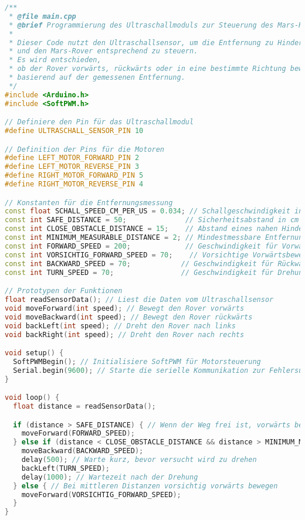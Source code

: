 \documentclass{vorlage-design-main}
\begin{document}
\begin{lstlisting}[language={C++}]
/**
 * @file main.cpp
 * @brief Programmierung des Ultraschallmoduls zur Steuerung des Mars-Rovers
 * 
 * Dieser Code nutzt den Ultraschallsensor, um die Entfernung zu Hindernissen zu messen 
 * und den Mars-Rover entsprechend zu steuern. 
 * Es wird entschieden, 
 * ob der Rover vorwärts, rückwärts oder in eine bestimmte Richtung bewegt werden soll, 
 * basierend auf der gemessenen Entfernung.
 */
#include <Arduino.h>
#include <SoftPWM.h>

// Definiere den Pin für das Ultraschallmodul
#define ULTRASCHALL_SENSOR_PIN 10

// Definition der Pins für die Motoren
#define LEFT_MOTOR_FORWARD_PIN 2
#define LEFT_MOTOR_REVERSE_PIN 3
#define RIGHT_MOTOR_FORWARD_PIN 5
#define RIGHT_MOTOR_REVERSE_PIN 4

// Konstanten für die Entfernungsmessung
const float SCHALL_SPEED_CM_PER_US = 0.034; // Schallgeschwindigkeit in cm/µs
const int SAFE_DISTANCE = 50;              // Sicherheitsabstand in cm
const int CLOSE_OBSTACLE_DISTANCE = 15;    // Abstand eines nahen Hindernisses in cm
const int MINIMUM_MEASURABLE_DISTANCE = 2; // Mindestmessbare Entfernung in cm
const int FORWARD_SPEED = 200;             // Geschwindigkeit für Vorwärtsbewegung
const int VORSICHTIG_FORWARD_SPEED = 70;    // Vorsichtige Vorwärtsbewegung
const int BACKWARD_SPEED = 70;            // Geschwindigkeit für Rückwärtsbewegung
const int TURN_SPEED = 70;                // Geschwindigkeit für Drehung

// Prototypen der Funktionen
float readSensorData(); // Liest die Daten vom Ultraschallsensor
void moveForward(int speed); // Bewegt den Rover vorwärts
void moveBackward(int speed); // Bewegt den Rover rückwärts
void backLeft(int speed); // Dreht den Rover nach links
void backRight(int speed); // Dreht den Rover nach rechts

void setup() {
  SoftPWMBegin(); // Initialisiere SoftPWM für Motorsteuerung
  Serial.begin(9600); // Starte die serielle Kommunikation zur Fehlersuche
}

void loop() {
  float distance = readSensorData();

  if (distance > SAFE_DISTANCE) { // Wenn der Weg frei ist, vorwärts bewegen
    moveForward(FORWARD_SPEED);
  } else if (distance < CLOSE_OBSTACLE_DISTANCE && distance > MINIMUM_MEASURABLE_DISTANCE) { // Wenn ein Hindernis nahe ist, aber über dem Mindestabstand, rückwärts bewegen
    moveBackward(BACKWARD_SPEED);
    delay(500); // Warte kurz, bevor versucht wird zu drehen
    backLeft(TURN_SPEED);
    delay(1000); // Wartezeit nach der Drehung
  } else { // Bei mittleren Distanzen vorsichtig vorwärts bewegen
    moveForward(VORSICHTIG_FORWARD_SPEED);
  }
}



\end{lstlisting}
\end{document}

